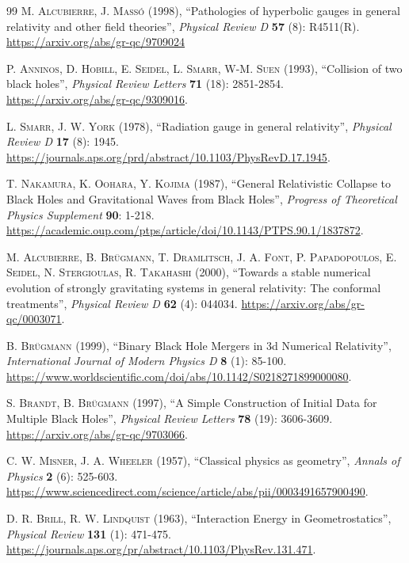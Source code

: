 \documentclass{article}
\begin{document}
\begin{thebibliography}{99}
\textsc{M. Alcubierre, J. Mass\'o} (1998), ``Pathologies of hyperbolic gauges in general relativity and other field theories'', \textit{Physical Review D} \textbf{57} (8): R4511(R). \url{https://arxiv.org/abs/gr-qc/9709024}

\textsc{P. Anninos, D. Hobill, E. Seidel, L. Smarr, W-M. Suen} (1993), ``Collision of two black holes'', \textit{Physical Review Letters} \textbf{71} (18): 2851-2854. \url{https://arxiv.org/abs/gr-qc/9309016}.

\textsc{L. Smarr, J. W. York} (1978), ``Radiation gauge in general relativity'', \textit{Physical Review D} \textbf{17} (8): 1945. \url{https://journals.aps.org/prd/abstract/10.1103/PhysRevD.17.1945}.

\textsc{T. Nakamura, K. Oohara, Y. Kojima} (1987), ``General Relativistic Collapse to Black Holes and Gravitational Waves from Black Holes'', \textit{Progress of Theoretical Physics Supplement} \textbf{90}: 1-218. \url{https://academic.oup.com/ptps/article/doi/10.1143/PTPS.90.1/1837872}.

\textsc{M. Alcubierre, B. Br\"ugmann, T. Dramlitsch, J. A. Font, P. Papadopoulos, E. Seidel, N. Stergioulas, R. Takahashi} (2000), ``Towards a stable numerical evolution of strongly gravitating systems in general relativity: The conformal treatments'', \textit{Physical Review D} \textbf{62} (4): 044034. \url{https://arxiv.org/abs/gr-qc/0003071}.

\textsc{B. Br\"ugmann} (1999), ``Binary Black Hole Mergers in 3d Numerical Relativity'', \textit{International Journal of Modern Physics D} \textbf{8} (1): 85-100. \url{https://www.worldscientific.com/doi/abs/10.1142/S0218271899000080}.

\textsc{S. Brandt, B. Br\"ugmann} (1997), ``A Simple Construction of Initial Data for Multiple Black Holes'', \textit{Physical Review Letters} \textbf{78} (19): 3606-3609. \url{https://arxiv.org/abs/gr-qc/9703066}.

\textsc{C. W. Misner, J. A. Wheeler} (1957), ``Classical physics as geometry'', \textit{Annals of Physics} \textbf{2} (6): 525-603. \url{https://www.sciencedirect.com/science/article/abs/pii/0003491657900490}.

\textsc{D. R. Brill, R. W. Lindquist} (1963), ``Interaction Energy in Geometrostatics'', \textit{Physical Review} \textbf{131} (1): 471-475. \url{https://journals.aps.org/pr/abstract/10.1103/PhysRev.131.471}.


\end{thebibliography}
\end{document}
